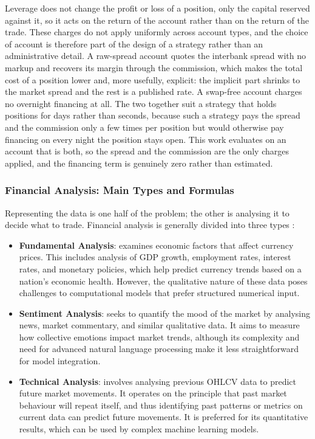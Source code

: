 Leverage does not change the profit or loss of a position, only the capital reserved against it, so it acts on the return of the account rather than on the return of the trade. These charges do not apply uniformly across account types, and the choice of account is therefore part of the design of a strategy rather than an administrative detail. A raw-spread account quotes the interbank spread with no markup and recovers its margin through the commission, which makes the total cost of a position lower and, more usefully, explicit: the implicit part shrinks to the market spread and the rest is a published rate. A swap-free account charges no overnight financing at all. The two together suit a strategy that holds positions for days rather than seconds, because such a strategy pays the spread and the commission only a few times per position but would otherwise pay financing on every night the position stays open. This work evaluates on an account that is both, so the spread and the commission are the only charges applied, and the financing term is genuinely zero rather than estimated.

\subsubsection{Financial Analysis: Main Types and Formulas}

Representing the data is one half of the problem; the other is analysing it to decide what to trade. Financial analysis is generally divided into three types \cite{lim_handbook_2015}:

\begin{itemize}
\item \textbf{Fundamental Analysis}: examines economic factors that affect currency prices. This includes analysis of GDP growth, employment rates, interest rates, and monetary policies, which help predict currency trends based on a nation's economic health. However, the qualitative nature of these data poses challenges to computational models that prefer structured numerical input.
\item \textbf{Sentiment Analysis}: seeks to quantify the mood of the market by analysing news, market commentary, and similar qualitative data. It aims to measure how collective emotions impact market trends, although its complexity and need for advanced natural language processing make it less straightforward for model integration.
\item \textbf{Technical Analysis}: involves analysing previous OHLCV data to predict future market movements. It operates on the principle that past market behaviour will repeat itself, and thus identifying past patterns or metrics on current data can predict future movements. It is preferred for its quantitative results, which can be used by complex machine learning models.
\end{itemize}

